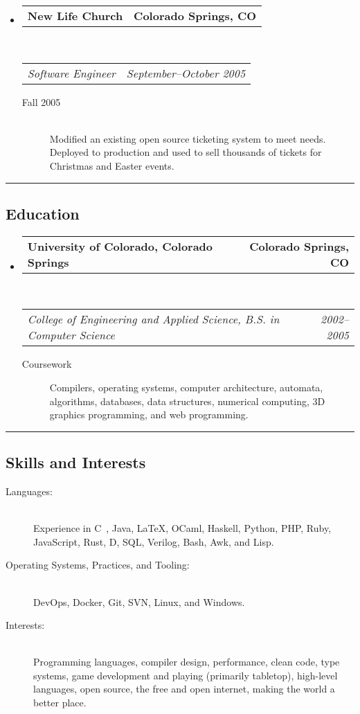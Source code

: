 \documentclass[10pt,letterpaper]{article}
\makeatletter
\newenvironment{indentsection}[1]%
{\begin{list}{}%
  {\setlength{\leftmargin}{#1}}%
  \item[]%
}
{\end{list}}
\newcommand{\headerrow}[2]
{\begin{tabular*}{\linewidth}{l@{\extracolsep{\fill}}r}
  #1 &
  #2 \\
\end{tabular*}}
\newcommand{\CPP}
{C\nolinebreak[4]\hspace{-.05em}\raisebox{.22ex}{\footnotesize\bf ++}}
\makeatother
\begin{document}
\begin{itemize}
  \item
  \headerrow
    {\textbf{New Life Church}}
    {\textbf{Colorado Springs, CO}}
  \\
  \headerrow
    {\emph{Software Engineer}}
    {\emph{September--October 2005}}
  \begin{description}
    \item[Fall 2005] \hfill \\
        Modified an existing open source ticketing system to meet needs. \\
        Deployed to production and used to sell thousands of tickets for Christmas and Easter events.
  \end{description}

\end{itemize}


\hrule
\vspace{-0.4em}
\subsection*{Education}

\begin{itemize}
  \parskip=0.1em

  \item
  \headerrow
    {\textbf{University of Colorado, Colorado Springs}}
    {\textbf{Colorado Springs, CO}}
  \\
  \headerrow
    {\emph{College of Engineering and Applied Science, B.S. in Computer Science}}
    {\emph{2002--2005}}
  \begin{description}
    \item[Coursework] Compilers, operating systems, computer architecture, automata, algorithms, databases, data structures, numerical computing, 3D graphics programming, and web programming.
  \end{description}

\end{itemize}


\hrule
\vspace{-0.4em}
\subsection*{Skills and Interests}

\begin{indentsection}{\parindent}
\begin{description}
  \item[Languages:] \ \\
  Experience in \CPP \ , Java, \LaTeX, OCaml, Haskell, Python, PHP, Ruby, JavaScript, Rust, D, SQL, Verilog, Bash, Awk, and Lisp.
  \item[Operating Systems, Practices, and Tooling:] \ \\
  DevOps, Docker, Git, SVN, Linux, and Windows.
  \item[Interests:] \ \\
  Programming languages, compiler design, performance, clean code, type systems, game development and playing (primarily tabletop), high-level languages, open source, the free and open internet, making the world a better place.
\end{description}
\end{indentsection}
\end{document}
